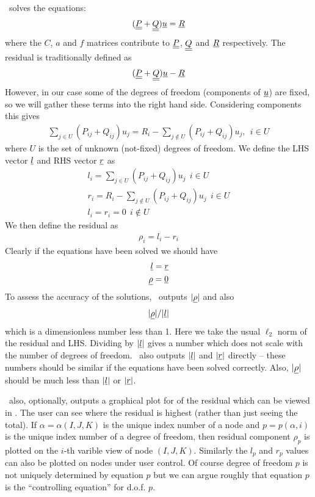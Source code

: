 \documentclass[a4paper]{article}
\begin{document}
\zinc\ solves the equations:
\begin{eqnarray}
  (\underline{\underline{P}}+\underline{\underline{Q}}){\underline{u}}={\underline{R}}
\end{eqnarray}
where the $C$, $a$ and $f$ matrices contribute to $\underline{\underline{P}}$,
$\underline{\underline{Q}}$ and ${\underline{R}}$ respectively. The residual is traditionally
defined as
\begin{eqnarray}
  (\underline{\underline{P}}+\underline{\underline{Q}}){\underline{u}}-{\underline{R}}
\end{eqnarray}
However, in our case some of the degrees of freedom (components of ${\underline{u}}$) are fixed, so we will gather these terms into the right hand
side. Considering components this gives
\begin{eqnarray}
  \sum_{j \in U}(P_{ij}+Q_{ij})u_j=R_i-\sum_{j \notin U}(P_{ij}+Q_{ij})u_j,
~~i \in U 
\end{eqnarray}
where $U$ is the set of unknown (not-fixed) degrees of freedom.  We
define the LHS vector ${\underline{l}}$ and RHS vector ${\underline{r}}$ as
\begin{eqnarray}
  l_i=\sum_{j \in U}(P_{ij}+Q_{ij})u_j~~i \in U\\
  r_i=R_i-\sum_{j \notin U}(P_{ij}+Q_{ij})u_j~~ i \in U\\
  l_i=r_i=0 ~~ i \notin U
\end{eqnarray}
We then define the residual as
\begin{eqnarray}
  \rho_i=l_i-r_i
\end{eqnarray}
Clearly if the equations have been solved we should have
\begin{eqnarray}
  {\underline{l}}={\underline{r}}\\
  {\underline{\rho}}={\underline{0}}
\end{eqnarray}
To assess the accuracy of the solutions, \zinc\ outputs $|{\underline{\rho}}|$
and also
\begin{eqnarray}
  |{\underline{\rho}}|/|{\underline{l}}|
\end{eqnarray}
which is a dimensionless number less than 1. Here we take the usual
$\ell_2$ norm of the residual and LHS. Dividing by $|{\underline{l}}|$ gives a
number which does not scale with the number of degrees of
freedom. \zinc\ also outputs $|{\underline{l}}|$ and $|{\underline{r}}|$ directly -- these
numbers should be similar if the equations have been solved
correctly. Also, $|{\underline{\rho}}|$ should be much less than $|{\underline{l}}|$ or
$|{\underline{r}}|$.

\zinc\ also, optionally, outputs a graphical plot for of the residual
which can be viewed in . The user can see where the residual is
highest (rather than just seeing the total). If $\alpha=\alpha(I,J,K)$
is the unique index number of a node and $p=p(\alpha,i)$ is the unique
index number of a degree of freedom, then residual component $\rho_p$
is plotted on the $i$-th varible view of node $(I,J,K)$. Similarly the
$l_p$ and $r_p$ values can also be plotted on nodes under user
control. Of course degree of freedom $p$ is not uniquely determined by
equation $p$ but we can argue roughly that equation $p$ is the
``controlling equation'' for d.o.f. $p$.
\end{document}
